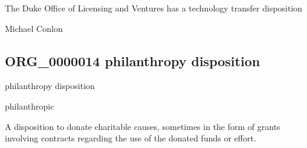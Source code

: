 \documentclass[letterpaper,10pt,english]{sphinxmanual}
\begin{document}
\begin{sphinxShadowBox}

\sphinxAtStartPar
The Duke Office of Licensing and Ventures has a technology transfer disposition
\end{sphinxShadowBox}

\begin{sphinxShadowBox}

\sphinxAtStartPar
Michael Conlon 
\end{sphinxShadowBox}
\begin{quote}

\ignorespaces \end{quote}


\subsection{ORG\_0000014 \sphinxhyphen{} philanthropy disposition}
\label{\detokenize{doc-ORG_0000014:org-0000014-philanthropy-disposition}}\label{\detokenize{doc-ORG_0000014:index-0}}\label{\detokenize{doc-ORG_0000014::doc}}
\begin{sphinxShadowBox}

\sphinxAtStartPar
philanthropy disposition
\end{sphinxShadowBox}

\begin{sphinxShadowBox}

\sphinxAtStartPar
philanthropic
\end{sphinxShadowBox}

\begin{sphinxShadowBox}

\sphinxAtStartPar
{\hyperref[\detokenize{doc-BFO_0000016::doc}]{}}
\end{sphinxShadowBox}

\begin{sphinxShadowBox}

\sphinxAtStartPar
A disposition to donate charitable causes, sometimes in the form of grants involving contracts regarding the use of the donated funds or effort.
\end{sphinxShadowBox}
\end{document}
